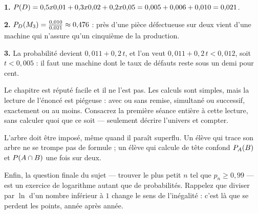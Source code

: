 \begin{corrige}
\textbf{1.} $\proba{D} = 0{,}5 \times 0{,}01+0{,}3 \times 0{,}02
+0{,}2 \times 0{,}05 = 0{,}005+0{,}006+0{,}010 = 0{,}021$.

\textbf{2.} $\probacond{M_{3}}{D} = \frac{0{,}010}{0{,}021}
\approx 0{,}476$ : près d'une pièce défectueuse sur deux vient d'une machine
qui n'assure qu'un cinquième de la production.

\textbf{3.} La probabilité devient $0{,}011+0{,}2\,t$, et l'on veut
$0{,}011+0{,}2\,t<0{,}012$, soit $t<0{,}005$ : il faut une machine dont le
taux de défauts reste sous un demi pour cent.
\end{corrige}

\begin{notepourlaclasse}
Le chapitre est réputé facile et il ne l'est pas. Les calculs sont simples,
mais la lecture de l'énoncé est piégeuse : avec ou sans remise, simultané ou
successif, exactement ou au moins. Consacrez la première séance entière à
cette lecture, sans calculer quoi que ce soit — seulement décrire l'univers et
compter.

L'arbre doit être imposé, même quand il paraît superflu. Un élève qui trace
son arbre ne se trompe pas de formule ; un élève qui calcule de tête confond
$\probacond{B}{A}$ et $\proba{A \cap B}$ une fois sur deux.

Enfin, la question finale du sujet — trouver le plus petit $n$ tel que
$p_{n} \geq 0{,}99$ — est un exercice de logarithme autant que de
probabilités. Rappelez que diviser par $\ln$ d'un nombre inférieur à $1$
change le sens de l'inégalité : c'est là que se perdent les points, année
après année.
\end{notepourlaclasse}

